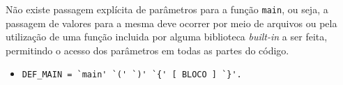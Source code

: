 \begin{itemize}
            Não existe
            passagem explícita de parâmetros para a função \verb!main!, ou seja,
            a passagem de valores para a mesma deve ocorrer por meio de
            arquivos ou pela utilização de uma função incluida por alguma
            biblioteca \emph{built-in} a ser feita, permitindo o acesso dos
            parâmetros em todas as partes do código. 
        \begin{itemize}
            \item \verb$DEF_MAIN = `main' `(' `)' `{' [ BLOCO ] `}'.$
        \end{itemize}
\end{itemize}

